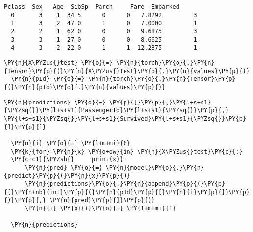               \begin{tcolorbox}[breakable, size=fbox, boxrule=.5pt, pad at break*=1mm, opacityfill=0]
  \begin{Verbatim}[commandchars=\\\{\}]
     Pclass  Sex   Age  SibSp  Parch     Fare  Embarked
  0       3    1  34.5      0      0   7.8292         3
  1       3    2  47.0      1      0   7.0000         1
  2       2    1  62.0      0      0   9.6875         3
  3       3    1  27.0      0      0   8.6625         1
  4       3    2  22.0      1      1  12.2875         1
  \end{Verbatim}
  \end{tcolorbox}
          
      \begin{tcolorbox}[breakable, size=fbox, boxrule=1pt, pad at break*=1mm,colback=cellbackground, colframe=cellborder]
  \begin{Verbatim}[commandchars=\\\{\}]
  \PY{n}{X\PYZus{}test} \PY{o}{=} \PY{n}{torch}\PY{o}{.}\PY{n}{Tensor}\PY{p}{(}\PY{n}{X\PYZus{}test}\PY{o}{.}\PY{n}{values}\PY{p}{)}
  \PY{n}{pId} \PY{o}{=} \PY{n}{torch}\PY{o}{.}\PY{n}{Tensor}\PY{p}{(}\PY{n}{pId}\PY{o}{.}\PY{n}{values}\PY{p}{)}
  \end{Verbatim}
  \end{tcolorbox}

      \begin{tcolorbox}[breakable, size=fbox, boxrule=1pt, pad at break*=1mm,colback=cellbackground, colframe=cellborder]
  \begin{Verbatim}[commandchars=\\\{\}]
  \PY{n}{predictions} \PY{o}{=} \PY{p}{[}\PY{p}{[}\PY{l+s+s1}{\PYZsq{}}\PY{l+s+s1}{PassengerId}\PY{l+s+s1}{\PYZsq{}}\PY{p}{,} \PY{l+s+s1}{\PYZsq{}}\PY{l+s+s1}{Survived}\PY{l+s+s1}{\PYZsq{}}\PY{p}{]}\PY{p}{]}

  \PY{n}{i} \PY{o}{=} \PY{l+m+mi}{0}
  \PY{k}{for} \PY{n}{x} \PY{o+ow}{in} \PY{n}{X\PYZus{}test}\PY{p}{:}
  \PY{c+c1}{\PYZsh{}     print(x)}
      \PY{n}{pred} \PY{o}{=} \PY{n}{model}\PY{o}{.}\PY{n}{predict}\PY{p}{(}\PY{n}{x}\PY{p}{)}
      \PY{n}{predictions}\PY{o}{.}\PY{n}{append}\PY{p}{(}\PY{p}{[}\PY{n+nb}{int}\PY{p}{(}\PY{n}{pId}\PY{p}{[}\PY{n}{i}\PY{p}{]}\PY{p}{)}\PY{p}{,} \PY{n}{pred}\PY{p}{]}\PY{p}{)}
      \PY{n}{i} \PY{o}{+}\PY{o}{=} \PY{l+m+mi}{1}

  \PY{n}{predictions}
  \end{Verbatim}
  \end{tcolorbox}

